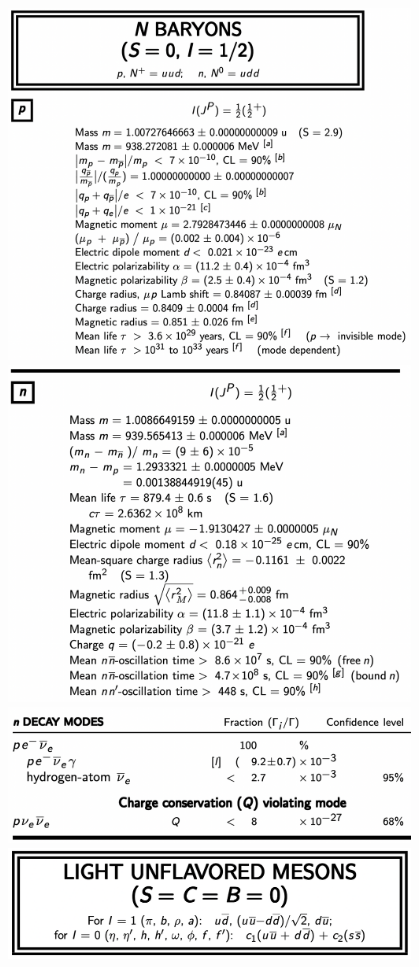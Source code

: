 \documentclass[txfonts]{NSTexam}
\begin{document}
\begin{questions}
\begin{center}
\includegraphics[width=0.8\textwidth]{PDG/N_BARYONS_AND_PROTON.png}
\includegraphics[width=0.8\textwidth]{PDG/neutron.png}
\includegraphics[width=0.8\textwidth]{PDG/neutron_DECAY_MODES.png}
\includegraphics[width=0.8\textwidth]{PDG/LIGHT_UNFLAVOURED_MESONS.png}

\end{center}
\end{questions}
\end{document}
